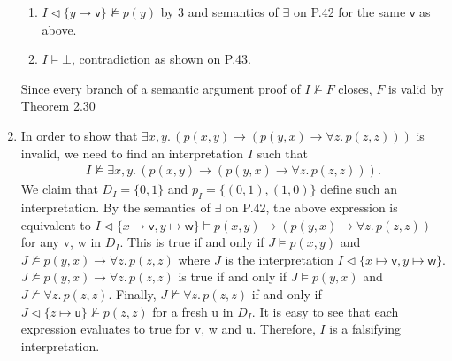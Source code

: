 \begin{exer}[2.2]
\begin{enumerate}[label=(\alph*)]
\begin{enumerate}[label=\arabic*.]
               \item %
                   $I \vartriangleleft \{ y \mapsto \textsf{v} \} \not\models p(y)$ by 3 and semantics of $\exists$ on P.42 for the same $\textsf{v}$ as above.
               \item %
                   $I \models \bot$, contradiction as shown on P.43.
           \end{enumerate}
           Since every branch of a semantic argument proof of $I \not\models F$ closes, $F$ is valid by Theorem 2.30
        \item %
            In order to show that $\exists x, y.\, (p(x, y) \rightarrow (p(y, x) \rightarrow \forall z.\, p(z, z)))$ is invalid,
            we need to find an interpretation $I$ such that
            \begin{align*}
                I \not\models \exists x, y.\, (p(x, y) \rightarrow (p(y, x) \rightarrow \forall z.\, p(z, z))).
            \end{align*}
            We claim that $D_I = \{ 0, 1 \}$ and $p_I = \{ (0, 1), (1, 0) \}$ define such an interpretation.
            By the semantics of $\exists$ on P.42, the above expression is equivalent to $I \vartriangleleft \{ x \mapsto \textsf{v}, y \mapsto \textsf{w} \} \models p(x, y) \rightarrow (p(y, x) \rightarrow \forall z.\, p(z, z))$ for any \textsf{v}, \textsf{w} in $D_I$.
            This is true if and only if $J \models p(x, y)$ and $J \not\models p(y, x) \rightarrow \forall z.\, p(z, z)$ where $J$ is the interpretation $I \vartriangleleft \{ x \mapsto \textsf{v}, y \mapsto \textsf{w} \}$.
            $J \not\models p(y, x) \rightarrow \forall z.\, p(z, z)$ is true if and only if $J \models p(y, x)$ and $J \not\models \forall z.\, p(z, z)$.
            Finally, $J \not\models \forall z.\, p(z, z)$ if and only if $J \vartriangleleft \{ z \mapsto \textsf{u} \} \not\models p(z, z)$ for a fresh \textsf{u} in $D_I$.
            It is easy to see that each expression evaluates to true for \textsf{v}, \textsf{w} and \textsf{u}.
            Therefore, $I$ is a falsifying interpretation.
    \end{enumerate}
\end{exer}

